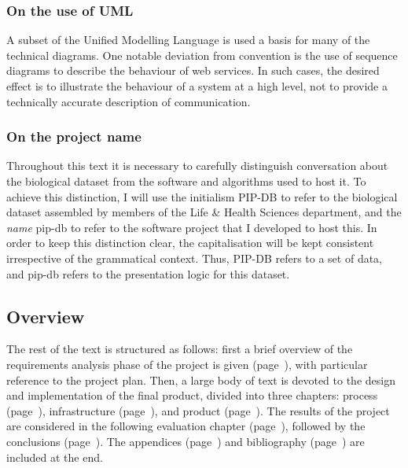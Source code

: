 \subsubsection*{On the use of UML}
A subset of the Unified Modelling Language \cite{ibm2003uml} is used a
basis for many of the technical diagrams. One notable deviation from
convention is the use of sequence diagrams \cite{ibm2004sequence} to
describe the behaviour of web services. In such cases, the desired
effect is to illustrate the behaviour of a system at a high level, not
to provide a technically accurate description of communication.


\subsubsection*{On the project name}
Throughout this text it is necessary to carefully distinguish
conversation about the biological dataset from the software and
algorithms used to host it. To achieve this distinction, I will use
the initialism PIP-DB to refer to the biological dataset assembled by
members of the Life \& Health Sciences department, and the
\textit{name} pip-db to refer to the software project that I developed
to host this. In order to keep this distinction clear, the
capitalisation will be kept consistent irrespective of the grammatical
context. Thus, PIP-DB refers to a set of data, and pip-db refers to
the presentation logic for this dataset.


\subsection*{Overview}
The rest of the text is structured as follows: first a brief overview
of the requirements analysis phase of the project is given
(page~\pageref{chap:requirements}), with particular reference to the
project plan. Then, a large body of text is devoted to the design and
implementation of the final product, divided into three chapters:
process (page~\pageref{chap:process}), infrastructure
(page~\pageref{chap:infrastructure}), and product
(page~\pageref{chap:product}). The results of the project are
considered in the following evaluation chapter
(page~\pageref{chap:evaluation}), followed by the conclusions
(page~\pageref{chap:conclusion}). The appendices
(page~\pageref{appendices}) and bibliography
(page~\pageref{bibliography}) are included at the end.
